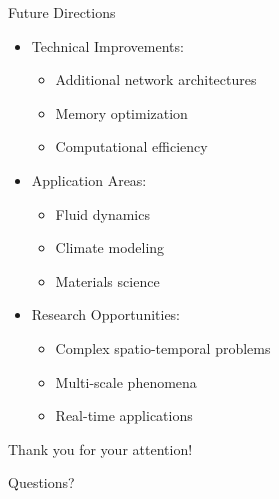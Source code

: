 \documentclass{beamer}
\begin{document}
\begin{frame}{Future Directions}
    \begin{itemize}
        \item Technical Improvements:
        \begin{itemize}
            \item Additional network architectures
            \item Memory optimization
            \item Computational efficiency
        \end{itemize}
        \item Application Areas:
        \begin{itemize}
            \item Fluid dynamics
            \item Climate modeling
            \item Materials science
        \end{itemize}
        \item Research Opportunities:
        \begin{itemize}
            \item Complex spatio-temporal problems
            \item Multi-scale phenomena
            \item Real-time applications
        \end{itemize}
    \end{itemize}
\end{frame}

\begin{frame}
    \centering
    \Huge Thank you for your attention!
    
    \vspace{1cm}
    \Large Questions?
\end{frame}
\end{document}
